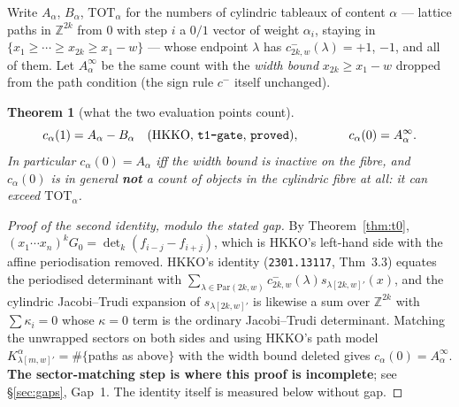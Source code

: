 \documentclass[11pt]{article}
\theoremstyle{plain}
\newtheorem{theorem}{Theorem}
\theoremstyle{definition}
\newcommand{\Par}{\mathrm{Par}}
\begin{document}
Write $A_\alpha$, $B_\alpha$, $\mathrm{TOT}_\alpha$ for the numbers of cylindric tableaux of
content $\alpha$ --- lattice paths in $\mathbb{Z}^{2k}$ from $0$ with step $i$ a $0/1$ vector
of weight $\alpha_i$, staying in $\{x_1\ge\cdots\ge x_{2k}\ge x_1-w\}$ --- whose endpoint
$\lambda$ has $c^-_{2k,w}(\lambda)=+1$, $-1$, and all of them. Let $A^\infty_\alpha$ be the
same count with the \emph{width bound} $x_{2k}\ge x_1-w$ dropped from the path condition
(the sign rule $c^-$ itself unchanged).

\begin{theorem}[what the two evaluation points count]\label{thm:count}
\[
  c_\alpha(1)=A_\alpha-B_\alpha \quad\text{(HKKO, \texttt{t1-gate}, \texttt{proved})},
  \qquad\qquad
  c_\alpha(0)=A^\infty_\alpha .
\]
In particular $c_\alpha(0)=A_\alpha$ \emph{iff the width bound is inactive on the fibre},
and $c_\alpha(0)$ is in general \textbf{not} a count of objects in the cylindric fibre at
all: it can exceed $\mathrm{TOT}_\alpha$.
\end{theorem}

\begin{proof}[Proof of the second identity, modulo the stated gap]
By Theorem~\ref{thm:t0}, $(x_1\cdots x_n)^kG_0=\det_k(f_{i-j}-f_{i+j})$, which is HKKO's
left-hand side with the affine periodisation removed. HKKO's identity
(\texttt{2301.13117}, Thm~3.3) equates the periodised determinant with
$\sum_{\lambda\in\Par(2k,w)}c^-_{2k,w}(\lambda)s_{\lambda[2k,w]'}(x)$, and the cylindric
Jacobi--Trudi expansion of $s_{\lambda[2k,w]'}$ is likewise a sum over $\mathbb{Z}^{2k}$ with
$\sum\kappa_i=0$ whose $\kappa=0$ term is the ordinary Jacobi--Trudi determinant. Matching
the unwrapped sectors on both sides and using HKKO's path model
$K^\alpha_{\lambda[m,w]'}=\#\{$paths as above$\}$ with the width bound deleted gives
$c_\alpha(0)=A^\infty_\alpha$. \textbf{The sector-matching step is where this proof is
incomplete}; see \S\ref{sec:gaps}, Gap~1. The identity itself is measured below without gap.
\end{proof}
\end{document}
